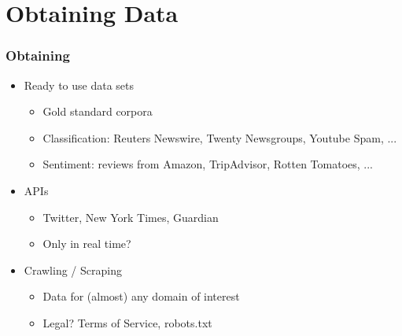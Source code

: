 
\section{Obtaining Data}

\begin{frame}
    \frametitle{Obtaining}
    \begin{itemize}
        \item Ready to use data sets
        \begin{itemize}
            \item Gold standard corpora
            \item Classification: Reuters Newswire, Twenty Newsgroups, Youtube Spam, ...
            \item Sentiment: reviews from Amazon, TripAdvisor, Rotten Tomatoes, ...
        \end{itemize}
        \item APIs
        \begin{itemize}
            \item Twitter, New York Times, Guardian
            \item Only in real time?
        \end{itemize}
        \item Crawling / Scraping
        \begin{itemize}
            \item Data for (almost) any domain of interest
            \item Legal? Terms of Service, robots.txt
        \end{itemize}
    \end{itemize}
\end{frame}


